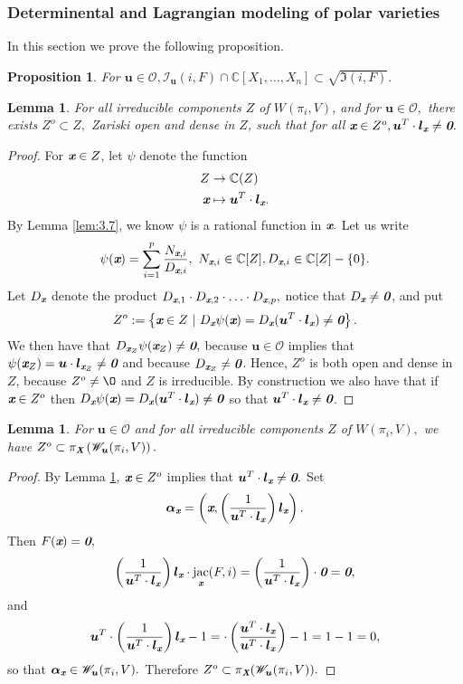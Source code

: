 \documentclass[a4paper]{article}
\def\bz{\textit{\textbf{0}}}
\def\Xb{\textit{\textbf{X}}}
\def\ub{{\bm u}}
\def\lb{{\bm l}}
\def\lxb{{\bm l_{\xb}}}
\def\ax{\bm \alpha_{\xb}}
\def\xb{\textit{\textbf{x}}}
\DeclareMathOperator{\jac}{jac}
\def\C{\mathbb{C}}
\def\Wi{W(\pi_i,V)}
\def\Iir{\sqrt{\mathfrak{I}(i,F)}}
\def\ji{\jac_{\xb}(F,i)}
\def\Iil{\mathscr{I}_{\ub}(i,F)}
\def\Wil{\mathscr{W}_{\ub}(\pi_i,V)}
\newtheorem{lemma}[theorem]{Lemma}
\newtheorem{prop}[theorem]{Proposition}
\begin{document}
\subsubsection{Determinental and Lagrangian modeling of polar varieties}
In this section we prove the following proposition.
%
\begin{prop}\label{prop:polarVs}
For $\ub \in \mathscr{O}, \Iil \cap \C[X_1,\hdots,X_n] \subset \Iir.$
\end{prop}
%
%
\begin{lemma}\label{lem:3.8}
For all irreducible components $Z$ of $\Wi$, and for $\ub \in \mathscr{O},$ there exists $Z^o \subset Z,$ Zariski open and dense in $Z$, such that for all $\xb \in Z^o, \ub^T\cdot \lb_{\xb} \not = \bz.$
\end{lemma}
%
\begin{proof}
For $\xb \in Z$, let $\psi$ denote the function 
\begin{align*}
Z  &\rightarrow \C(Z)\\    
    \xb &\mapsto \ub^T \cdot \lb_{\xb}.    
\end{align*}
 By Lemma \ref{lem:3.7}, we know $\psi$ is a rational function in $\xb.$ Let us write 
\[
\psi(\xb) = \sum_{i=1}^p\frac{N_{\xb,i}}{D_{\xb,i}},~N_{\xb,i} \in \C[Z], D_{\xb,i} \in \C[Z]-\{0\}. 
\]
Let $D_{\xb}$ denote the product $D_{\xb,1}\cdot D_{\xb,2} \cdot \hdots \cdot D_{\xb,p},$ notice that $D_{\xb} \not = \bz$, and put  
\[
Z^o := \left\{\xb \in Z~|~D_{\xb}\psi(\xb) = D_{\xb}(\ub^T \cdot \lb_{\xb})\not = \bz\right\}.
\]
We then have that $D_{\xb_Z}\psi(\xb_Z) \not = \bz,$
because $\ub \in \mathscr{O}$ implies that $\psi(\xb_Z)= \ub \cdot \lb_{\xb_Z} \not = \bz$ and because $D_{\xb_Z} \not = \bz$.  Hence, $Z^o$ is both open and dense in $Z$, because $Z^o \not = \O$ and $Z$ is irreducible. By construction we also have that if $\xb \in Z^o$ then $D_{\xb}\psi(\xb) = D_{\xb}(\ub^T \cdot \lb_{\xb})\not = \bz$ so that $\ub^T \cdot \lb_{\xb}\not = \bz$.
\end{proof}
%
\begin{lemma}\label{lem:3.9}
For $\ub \in \mathscr{O}$ and for all irreducible components $Z$ of $\Wi,$ we have $Z^o \subset \pi_{\Xb}\left(\Wil\right).$
\end{lemma}
%
\begin{proof}
By Lemma \ref{lem:3.8}, $\xb \in Z^o$ implies that $\ub^T \cdot \lb_{\xb} \not = \bz.$ Set
\[
\bm \alpha_{\xb} = \left(\xb,\left(\frac{1}{\ub^T\cdot \lb_{\xb}}\right)\lb_{\xb}\right). 
\]
Then $F(\xb)=\bz,$
\begin{align*}
    \left(\frac{1}{\ub^T\cdot \lb_{\xb}}\right)\lxb\cdot \ji = \left(\frac{1}{\ub^T\cdot \lb_{\xb}}\right)\cdot \bz = \bz,
\end{align*}
and
\[
\ub^T\cdot\left(\frac{1}{\ub^T\cdot \lxb}\right)\lxb-1 =
    \cdot\left(\frac{\ub^T\cdot\lxb}{\ub^T\cdot \lxb}\right)-1=1-1=0,
\]
so that $\ax \in \Wil.$ Therefore $Z^o \subset \pi_{\Xb}(\Wil).$
%
\end{proof}
\end{document}
